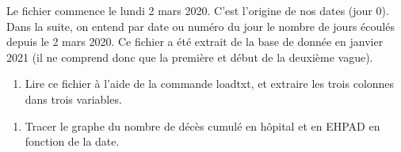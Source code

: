 \documentclass[letterpaper,10pt,english]{sphinxhowto}
\begin{document}
\sphinxAtStartPar
Le fichier commence le lundi 2 mars 2020. C’est l’origine de nos dates (jour 0). Dans la suite, on entend par date ou numéro du jour le nombre de jours écoulés depuis le 2 mars 2020. Ce fichier a été extrait de la base de donnée en janvier 2021 (il ne comprend donc que la première et début de la deuxième vague).
\begin{enumerate}
%
\item {} 
\sphinxAtStartPar
Lire ce fichier à l’aide de la commande loadtxt, et extraire les trois colonnes dans trois variables.

\end{enumerate}

\begin{sphinxVerbatim}[commandchars=\\\{\}]
   
   
   
\end{sphinxVerbatim}

\begin{sphinxVerbatim}[commandchars=\\\{\}]
     
\end{sphinxVerbatim}
\begin{enumerate}
%
\setcounter{enumi}{1}
\item {} 
\sphinxAtStartPar
Tracer le graphe du nombre de décès cumulé en hôpital et en EHPAD en fonction de la date.

\end{enumerate}

\begin{sphinxVerbatim}[commandchars=\\\{\}]
  
  

\end{sphinxVerbatim}
\end{document}
